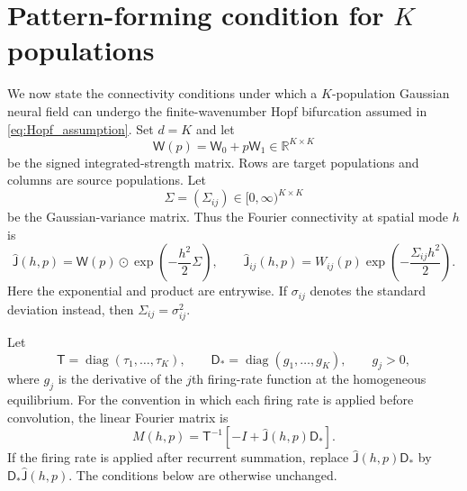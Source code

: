 \section{Pattern-forming condition for $K$ populations}
\label{sec:K-pattern-condition}

We now state the connectivity conditions under which a $K$-population
Gaussian neural field can undergo the finite-wavenumber Hopf bifurcation
assumed in \eqref{eq:Hopf_assumption}.  Set $d=K$ and let
\begin{equation}
 \mathsf W(p)=\mathsf W_0+p\mathsf W_1
 \in\mathbb R^{K\times K}
 \label{eq:K-strength-matrix}
\end{equation}
be the signed integrated-strength matrix.  Rows are target populations and
columns are source populations.  Let
\begin{equation}
 \Sigma=(\Sigma_{ij})\in[0,\infty)^{K\times K}
 \label{eq:K-variance-matrix}
\end{equation}
be the Gaussian-variance matrix.  Thus the Fourier connectivity at spatial
mode $h$ is
\begin{equation}
 \widehat{\mathsf J}(h,p)
 =\mathsf W(p)\odot
 \exp\left(-\frac{h^2}{2}\Sigma\right),
 \qquad
 \widehat{\mathsf J}_{ij}(h,p)
 =W_{ij}(p)\exp\left(-\frac{\Sigma_{ij}h^2}{2}\right).
 \label{eq:K-Fourier-connectivity}
\end{equation}
Here the exponential and product are entrywise.  If $\sigma_{ij}$ denotes
the standard deviation instead, then $\Sigma_{ij}=\sigma_{ij}^2$.

Let
\begin{equation}
 \mathsf T=\operatorname{diag}(\tau_1,\ldots,\tau_K),
 \qquad
 \mathsf D_*=\operatorname{diag}(g_1,\ldots,g_K),
 \qquad g_j>0,
 \label{eq:K-time-gain-matrices}
\end{equation}
where $g_j$ is the derivative of the $j$th firing-rate function at the
homogeneous equilibrium.  For the convention in which each firing rate is
applied before convolution, the linear Fourier matrix is
\begin{equation}
 M(h,p)=\mathsf T^{-1}
 \left[-I+\widehat{\mathsf J}(h,p)\mathsf D_*\right].
 \label{eq:K-linear-matrix}
\end{equation}
If the firing rate is applied after recurrent summation, replace
$\widehat{\mathsf J}(h,p)\mathsf D_*$ by
$\mathsf D_*\widehat{\mathsf J}(h,p)$.  The conditions below are otherwise
unchanged.

